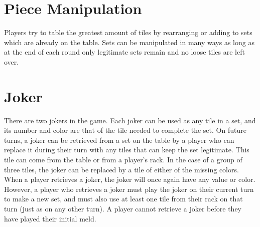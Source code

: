 \documentclass[a4paper,10pt]{article}
\begin{document}
\section{Piece Manipulation}
Players try to table the greatest amount of tiles by rearranging or adding to sets which are already on the table. Sets can be manipulated in many ways
as long as at the end of each round only legitimate sets remain and no loose tiles are left over.

\section{Joker}
There are two jokers in the game. Each joker can be used as any tile in a set, and its number and color are that of the tile needed to complete the set. On future turns, a joker can be retrieved from a set on the table by a player who can replace it during their turn with any tiles that can keep the set legitimate. This tile can come from the table or from a player’s rack. In the case of a group of three tiles, the joker can be replaced by a tile of either of the missing colors.
When a player retrieves a joker, the joker will once again have any value or color. However, a player who retrieves a joker must play the joker on their current turn to make a new set, and must also use at least one tile from their rack on that turn (just as on any other turn). A player cannot retrieve a joker before they have played their initial meld.
\end{document}
